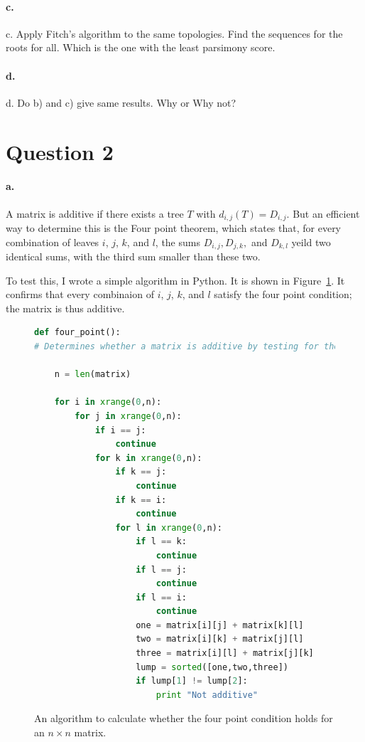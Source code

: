 \documentclass[12pt]{article}
\begin{document}
\paragraph{c.}
\label{par:1c}


c. Apply Fitch’s algorithm to the same topologies. Find the sequences 
for the roots for all. Which is the one with the least parsimony 
score. 

\paragraph{d.} 
d. Do b) and c) give same results. Why or Why not?

\clearpage
\section*{Question 2}
\paragraph{a.} %

A matrix is additive if there exists a tree $T$ with $d_{i,j}(T) = D_{i,j}$.  But an efficient way to determine this is the Four point theorem, which states that, for every combination of leaves $i$, $j$, $k$, and $l$, the sums $D_{i,j}, D_{j,k},$ and $ D_{k,l}$ yeild two identical sums, with the third sum smaller than these two.

To test this, I wrote a simple algorithm in Python.  It is shown in Figure~\ref{fourpoint}.  It confirms that every combinaion of  $i$, $j$, $k$, and $l$ satisfy the four point condition; the matrix is thus additive.

\begin{figure}[htb]
\centering
\begin{lstlisting}[language=Python]
def four_point():
# Determines whether a matrix is additive by testing for the four point condidtion.  Expects matrix as a list of lists

	n = len(matrix)

	for i in xrange(0,n):
		for j in xrange(0,n):
			if i == j:
				continue
			for k in xrange(0,n):
				if k == j:
					continue
				if k == i:
					continue
				for l in xrange(0,n):
					if l == k:
						continue
					if l == j:
						continue
					if l == i:
						continue
					one = matrix[i][j] + matrix[k][l]
					two = matrix[i][k] + matrix[j][l]
					three = matrix[i][l] + matrix[j][k]
					lump = sorted([one,two,three])
					if lump[1] != lump[2]:
						print "Not additive"
	\end{lstlisting}

	\caption{An algorithm to calculate whether the four point condition holds for an $n\times n$ matrix.}
	\label{fourpoint}


\end{figure}
\end{document}

